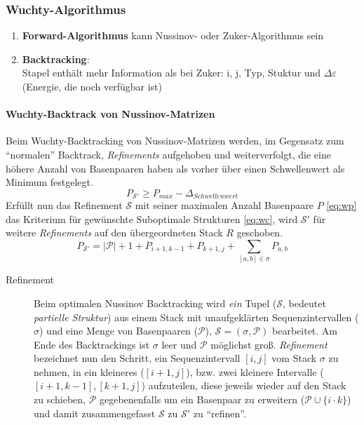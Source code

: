 \subsubsection{Wuchty-Algorithmus}
\begin{enumerate}
\item\textbf{Forward-Algorithmus} kann Nussinov- oder Zuker-Algorithmus sein
\item\textbf{Backtracking}:\\
Stapel enth\"alt mehr Information als bei Zuker:  i, j, Typ, Stuktur und $\Delta\varepsilon$ (Energie, die noch verf\"ugbar ist)
\end{enumerate}

\paragraph{Wuchty-Backtrack von Nussinov-Matrizen}
Beim Wuchty-Backtracking von Nussinov-Matrizen werden, im Gegensatz zum ``normalen''
Backtrack, \emph{Refinements} aufgehoben und weiterverfolgt, die eine h\"ohere Anzahl von Basenpaaren 
haben als vorher \"{u}ber einen Schwellenwert als Minimum festgelegt. 
\begin{equation} \label{eq:wc}
  P_{\mathcal{S}'} \geqslant P_{max}-\Delta_{Schwellenwert}
\end{equation}
Erf\"ullt nun das Refinement $\mathcal{S}$ mit seiner maximalen Anzahl Basenpaare $P$ \eqref{eq:wp} das 
Kriterium f\"ur gew\"unschte Suboptimale Strukturen \eqref{eq:wc}, wird $\mathcal{S}'$ f\"ur weitere 
\emph{Refinements} auf den \"ubergeordneten Stack $R$ geschoben. 
\begin{equation} \label{eq:wp}
	P_{\mathcal{S}'} = |\mathcal{P}| + 1 + P_{i+1,k-1} + P_{k+1,j} + \sum_{[a,b] \in \sigma} P_{a,b}
\end{equation}
\begin{description}
	\item[Refinement] Beim optimalen Nussinov Backtracking wird \emph{ein} Tupel 
		($\mathcal{S}$, bedeutet \emph{partielle Struktur}) aus einem Stack mit 
		unaufgekl\"arten Sequenzintervallen ($\sigma$) und eine Menge von 
		Basenpaaren ($\mathcal{P}$), $\mathcal{S}=(\sigma, \mathcal{P})$ bearbeitet. 
		Am Ende des Backtrackings ist $\sigma$ leer und $\mathcal{P}$ m\"oglichst groß. 
		\emph{Refinement} bezeichnet nun den Schritt, ein Sequenzintervall $[i,j]$ vom 
		Stack $\sigma$ zu nehmen, in ein kleineres ($[i+1,j]$), bzw. zwei kleinere Intervalle 
		($[i+1,k-1], [k+1,j]$) aufzuteilen, diese jeweils wieder auf den Stack zu 
		schieben, $\mathcal{P}$ gegebenenfalls um ein Basenpaar zu erweitern 
		($\mathcal{P} \cup \{i \cdotp k\}$) und damit zusammengefasst 
		$\mathcal{S}$ zu $\mathcal{S}'$ zu ``refinen''.
\end{description}

